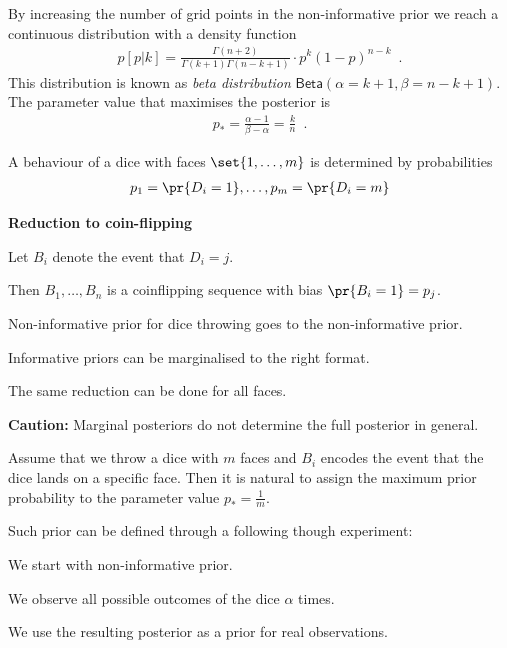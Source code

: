 \documentclass[landscape,footrule]{foils}
\begin{document}

By increasing the number of grid points in the non-informative prior we reach a continuous distribution with a density function
\begin{align*}  
p[p|k] = \frac{\Gamma(n+2)}{\Gamma(k+1)\Gamma(n-k+1)}\cdot p^k(1-p)^{n-k}\enspace.
\end{align*}
This distribution is known as \emph{beta distribution} $\mathsf{Beta}(\alpha=k+1, \beta=n-k+1)$.
The parameter value that maximises the posterior is 
\begin{align*}
p_* =\frac{\alpha-1}{\beta-\alpha}=\frac{k}{n}\enspace.
\end{align*} 


A behaviour of a dice with faces $\set{1,\ldots,m}$ is determined by probabilities 
\begin{align*}
p_1=\pr{D_i=1},\ldots, p_m=\pr{D_i=m}
\end{align*}

\textbf{Reduction to coin-flipping} 
\begin{triangles}
\item Let $B_i$ denote the event that $D_i=j$.
\item Then $B_1,\ldots, B_n$ is a coinflipping sequence with bias $\pr{B_i=1}=p_j$.
\item Non-informative prior for dice throwing goes to the non-informative prior.
\item Informative priors can be marginalised to the right format.
\item The same reduction can be done for all faces.    
\end{triangles} 
\vspace*{1cm}

\textbf{Caution:} Marginal posteriors do not determine the full posterior in general.


Assume that we throw a dice with $m$ faces and $B_i$ encodes the event that the dice lands on a specific face. Then it is natural to assign the maximum prior probability to the parameter value $p_*=\frac{1}{m}$.
\vspace*{1cm}

Such prior can be defined through a following though experiment:
\begin{triangles}
\item We start with non-informative prior.
\item We observe all possible outcomes of the dice $\alpha$ times.
\item We use the resulting posterior as a prior for real observations. 
\end{triangles}
\vspace*{1cm}
\end{document}
